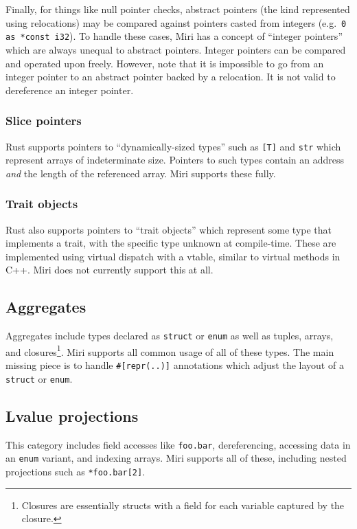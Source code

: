 \documentclass[twocolumn]{article}
\newcommand{\rust}[1]{\texttt{#1}}
\begin{document}
Finally, for things like null pointer checks, abstract pointers (the kind represented using
relocations) may be compared against pointers casted from integers (e.g.\ \rust{0 as *const i32}).
To handle these cases, Miri has a concept of ``integer pointers'' which are always unequal to
abstract pointers. Integer pointers can be compared and operated upon freely. However, note that it
is impossible to go from an integer pointer to an abstract pointer backed by a relocation. It is not
valid to dereference an integer pointer.

\subsubsection{Slice pointers}

Rust supports pointers to ``dynamically-sized types'' such as \rust{[T]} and \rust{str} which
represent arrays of indeterminate size. Pointers to such types contain an address \emph{and} the
length of the referenced array. Miri supports these fully.

\subsubsection{Trait objects}

Rust also supports pointers to ``trait objects'' which represent some type that implements a trait,
with the specific type unknown at compile-time. These are implemented using virtual dispatch with a
vtable, similar to virtual methods in C++. Miri does not currently support this at all.

\subsection{Aggregates}

Aggregates include types declared as \rust{struct} or \rust{enum} as well as tuples, arrays, and
closures\footnote{Closures are essentially structs with a field for each variable captured by the
closure.}. Miri supports all common usage of all of these types. The main missing piece is to handle
\texttt{\#[repr(..)]} annotations which adjust the layout of a \rust{struct} or \rust{enum}.

\subsection{Lvalue projections}

This category includes field accesses like \rust{foo.bar}, dereferencing, accessing data in an
\rust{enum} variant, and indexing arrays. Miri supports all of these, including nested projections
such as \rust{*foo.bar[2]}.
\end{document}
